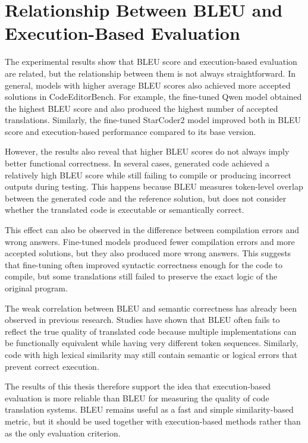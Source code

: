 \section{Relationship Between BLEU and Execution-Based Evaluation}

The experimental results show that BLEU score and execution-based evaluation
are related, but the relationship between them is not always straightforward.
In general, models with higher average BLEU scores also achieved more accepted
solutions in CodeEditorBench. For example, the fine-tuned Qwen model obtained
the highest BLEU score and also produced the highest number of accepted
translations. Similarly, the fine-tuned StarCoder2 model improved both in BLEU
score and execution-based performance compared to its base version.

However, the results also reveal that higher BLEU scores do not always imply
better functional correctness. In several cases, generated code achieved a
relatively high BLEU score while still failing to compile or producing incorrect
outputs during testing. This happens because BLEU measures token-level overlap
between the generated code and the reference solution, but does not consider
whether the translated code is executable or semantically correct.

This effect can also be observed in the difference between compilation errors
and wrong answers. Fine-tuned models produced fewer compilation errors and more
accepted solutions, but they also produced more wrong answers. This suggests
that fine-tuning often improved syntactic correctness enough for the code to
compile, but some translations still failed to preserve the exact logic of the
original program.

The weak correlation between BLEU and semantic correctness has already been %
observed in previous research. Studies have shown that BLEU often fails to
reflect the true quality of translated code because multiple implementations can
be functionally equivalent while having very different token sequences.
Similarly, code with high lexical similarity may still contain semantic or
logical errors that prevent correct execution.


The results of this thesis therefore support the idea that execution-based
evaluation is more reliable than BLEU for measuring the quality of code
translation systems. BLEU remains useful as a fast and simple similarity-based
metric, but it should be used together with execution-based methods rather than
as the only evaluation criterion.